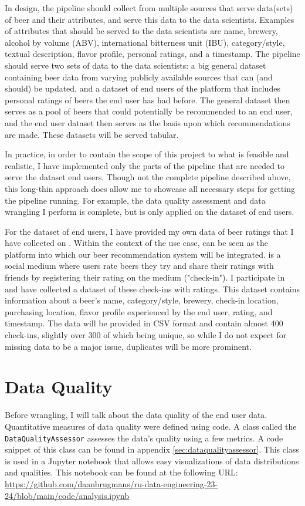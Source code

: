 \documentclass[sigconf]{acmart}
\begin{document}
In design, the pipeline should collect from multiple sources that serve data(sets) of beer and their attributes, and serve this data to the data scientists.
Examples of attributes that should be served to the data scientists are name, brewery, alcohol by volume (ABV), international bitterness unit (IBU), category/style, textual description, flavor profile, personal ratings, and a timestamp.
The pipeline should serve two sets of data to the data scientists: a big general dataset containing beer data from varying publicly available sources that can (and should) be updated, and a dataset of end users of the platform that includes personal ratings of beers the end user has had before.
The general dataset then serves as a pool of beers that could potentially be recommended to an end user, and the end user dataset then serves as the basis upon which recommendations are made.
These datasets will be served tabular.

In practice, in order to contain the scope of this project to what is feasible and realistic, I have implemented only the parts of the pipeline that are needed to serve the dataset end users.
Though not the complete pipeline described above, this long-thin approach does allow me to showcase all necessary steps for getting the pipeline running.
For example, the data quality assessment and data wrangling I perform is complete, but is only applied on the dataset of end users.

For the dataset of end users, I have provided my own data of beer ratings that I have collected on \citeauthor{untappd}.
Within the context of the use case, \citeauthor{untappd} can be seen as the platform into which our beer recommendation system will be integrated.
\citet{untappd} is a social medium where users rate beers they try and share their ratings with friends by registering their rating on the medium ("check-in").
I participate in \citeauthor{untappd} and have collected a dataset of these check-ins with ratings.
This dataset contains information about a beer's name, category/style, brewery, check-in location, purchasing location, flavor profile experienced by the end user, rating, and timestamp.
The data will be provided in CSV format and contain almost 400 check-ins, slightly over 300 of which being unique, so while I do not expect for missing data to be a major issue, duplicates will be more prominent.

\section{Data Quality}
Before wrangling, I will talk about the data quality of the end user data.
Quantitative measures of data quality were defined using code.
A class called the \texttt{DataQualityAssessor} assesses the data's quality using a few metrics.
A code snippet of this class can be found in appendix \ref{sec:dataqualityassessor}.
This class is used in a Jupyter notebook that allows easy visualizations of data distributions and qualities.
This notebook can be found at the following URL: \url{https://github.com/daanbrugmans/ru-data-engineering-23-24/blob/main/code/analysis.ipynb}
\end{document}
